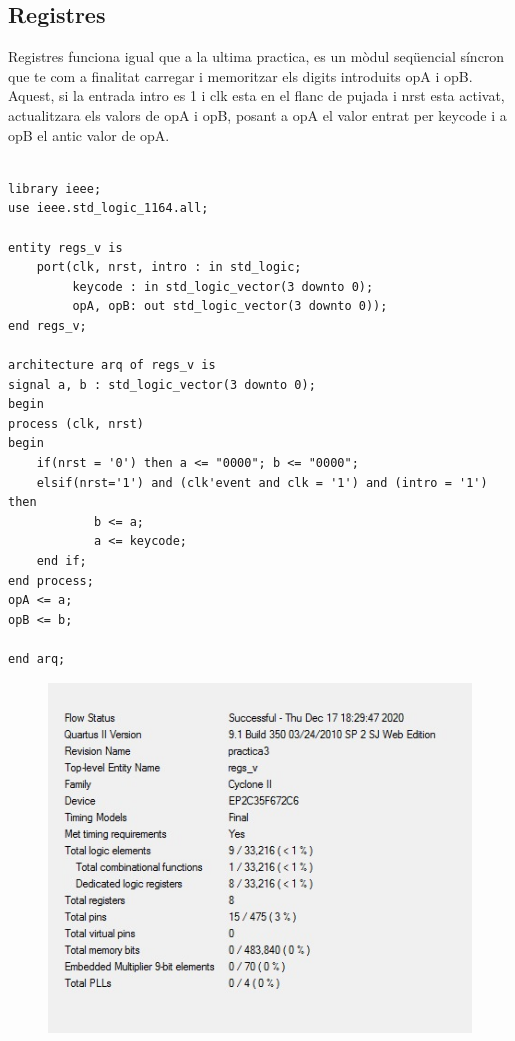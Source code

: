 \documentclass[12pt, a4papre]{article}
\begin{document}
		
\subsection{Registres}

	Registres funciona igual que a la ultima practica, es un mòdul seqüencial síncron que te com a finalitat carregar i memoritzar els digits introduits opA i opB. Aquest, si la entrada intro es 1 i clk esta en el flanc de pujada i nrst esta activat, actualitzara els valors de opA i opB, posant a opA el valor entrat per keycode i a opB el antic valor de opA.
	
		\begin{lstlisting}[style=vhdl, frame=single, basicstyle=\tiny]

library ieee;
use ieee.std_logic_1164.all;

entity regs_v is
	port(clk, nrst, intro : in std_logic;
		 keycode : in std_logic_vector(3 downto 0);
		 opA, opB: out std_logic_vector(3 downto 0));
end regs_v;

architecture arq of regs_v is
signal a, b : std_logic_vector(3 downto 0);
begin
process (clk, nrst)
begin 
	if(nrst = '0') then a <= "0000"; b <= "0000";
	elsif(nrst='1') and (clk'event and clk = '1') and (intro = '1') then
			b <= a;
			a <= keycode;
	end if;
end process;
opA <= a;
opB <= b;

end arq;

		\end{lstlisting}
		
			\begin{figure}[H]
		\begin{center}
		\includegraphics[width=130mm]{informeRegs.jpeg}
		\end{center}
	\end{figure}	
\end{document}

